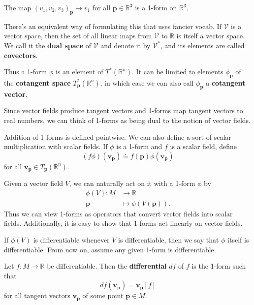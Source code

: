 \documentclass[10pt]{report}
\begin{document}
\begin{ex}
	The map $(v_1,v_2,v_3)_{\mathbf{p}}\mapsto v_1$ for all $\mathbf{p} \in \mathbb{R}^3$ is a 1-form on $\mathbb{R}^3$.
\end{ex}

There's an equivalent way of formulating this that uses fancier vocab. If $\mathcal{V}$ is a vector space, then the set of all linear maps from $\mathcal{V}$ to $\mathbb{R}$ is itself a vector space. We call it the \textbf{dual space} of $\mathcal{V}$ and denote it by $\mathcal{V}^*$, and its elements are called \textbf{covectors}.

Thus a 1-form $\phi$ is an element of $T^*(\mathbb{R}^n)$. It can be limited to elements $\phi_\mathbf{p}$ of the \textbf{cotangent space} $T_{\mathbf{p}}^*(\mathbb{R}^n)$, in which case we can also call $\phi_\mathbf{p}$ a \textbf{cotangent vector}.

\begin{note}
Since vector fields produce tangent vectors and 1-forms map tangent vectors to real numbers, we can think of 1-forms as being dual to the notion of vector fields.
\end{note}

Addition of 1-forms is defined pointwise. We can also define a sort of scalar multiplication with scalar fields. If $\phi$ is a 1-form and $f$ is a scalar field, define
\[
	(f\phi)(\mathbf{v}_{\mathbf{p}}) \doteq f(\mathbf{p}) \phi(\mathbf{v}_\mathbf{p})
\] for all $\mathbf{v}_{\mathbf{p}} \in T_\mathbf{p}(\mathbb{R}^n)$.

Given a vector field $V$, we can naturally act on it with a 1-form $\phi$ by
\begin{align*}
	\phi(V):M&\to \mathbb{R} \\
	\mathbf{p}&\mapsto \phi(V(\mathbf{p})).
\end{align*}
Thus we can view 1-forms as operators that convert vector fields into scalar fields. Additionally, it is easy to show that 1-forms act linearly on vector fields.

\begin{note}
	If $\phi(V)$ is differentiable whenever $V$ is differentiable, then we say that $\phi$ itself is differentiable. From now on, assume any given 1-form is differentiable.
\end{note}

\begin{defn}
Let $f:M\to \mathbb{R}$ be differentiable. Then the \textbf{differential} $df$ of $f$ is the 1-form such that
\[
	df(\mathbf{v}_{\mathbf{p}}) = \mathbf{v}_{\mathbf{p}}[f]
\] for all tangent vectors $\mathbf{v}_{\mathbf{p}}$ of some point $\mathbf{p} \in M$.
\end{defn}
\end{document}
